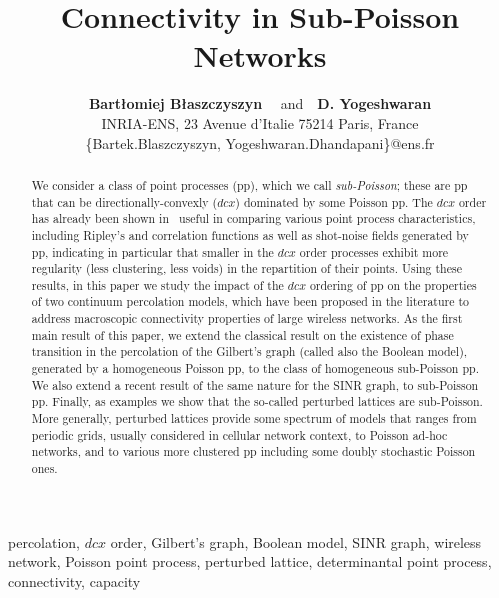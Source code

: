 \documentclass[conference]{IEEEtran}
\begin{document}
\title{Connectivity in Sub-Poisson Networks\vspace{-1ex}}

\author{
\large {\bf Bart{\l }omiej B{\l }aszczyszyn}
\ \ and\ \  {\bf D. Yogeshwaran}\\
INRIA-ENS, 23 Avenue d'Italie  75214 Paris, France\\
\{Bartek.Blaszczyszyn,  Yogeshwaran.Dhandapani\}@ens.fr
\vspace{-2ex}
}

\maketitle

\thispagestyle{empty} \pagestyle{empty}

\begin{abstract}
We consider a class  of point processes (pp), which we call {\em
  sub-Poisson}; these are pp
that can be  directionally-convexly ($dcx$) dominated 
by some Poisson pp. 
The $dcx$ order has already been shown in~\cite{snorder} useful 
in comparing various point process characteristics,
including Ripley's and correlation functions 
as well as shot-noise fields generated by pp,
indicating in particular 
that smaller in the $dcx$ order 
processes exhibit more regularity (less
clustering, less voids) in the repartition of their points. 
Using these results, 
in this paper we study the impact of the $dcx$ ordering of pp
on the properties of two  continuum percolation models, 
which have been proposed in the literature
to address macroscopic connectivity properties of
large wireless networks.
As the first main result of this paper, 
we extend the classical result on the existence
of phase transition in the percolation of the Gilbert's graph
(called also the Boolean model), generated by a homogeneous Poisson
pp,  to the class of homogeneous sub-Poisson pp.
We also extend  a recent result of the same nature for the
SINR graph, to sub-Poisson pp.
Finally, as examples we show that the so-called 
perturbed lattices are sub-Poisson.  
More generally,  perturbed lattices  provide some spectrum of models 
that ranges from periodic grids, usually considered in cellular network
context, to Poisson ad-hoc networks, 
and to various more clustered pp including
some doubly stochastic Poisson ones. 
\end{abstract}

\begin{keywords} 
percolation, $dcx$ order,  Gilbert's graph, Boolean model, SINR graph, 
 wireless network, Poisson point process, perturbed lattice, 
determinantal point process, connectivity, capacity  
\end{keywords}
\end{document}

